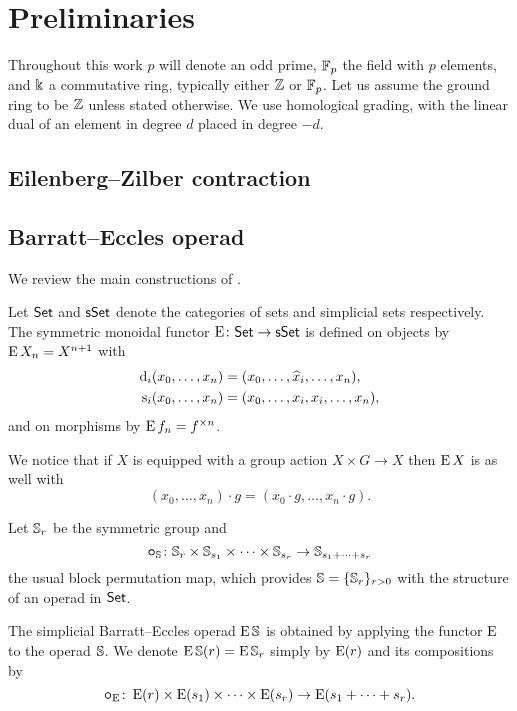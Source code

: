 
\section{Preliminaries}

Throughout this work $p$ will denote an odd prime, ${\mathbb{F}_p}$ the field with $p$ elements, and $\Bbbk$ a commutative ring, typically either $\mathbb{Z}$ or ${\mathbb{F}_p}$.
Let us assume the ground ring to be $\mathbb{Z}$ unless stated otherwise.
We use homological grading, with the linear dual of an element in degree $d$ placed in degree $-d$.

\subsection{Eilenberg--Zilber contraction}

\TBW

\subsection{Barratt--Eccles operad}

We review the main constructions of \cite{berger2004combinatorial}.

\sssec

Let $\mathsf{Set}$ and $\mathsf{sSet}$ denote the categories of sets and simplicial sets respectively.
The symmetric monoidal functor $\operatorname{E} \colon \mathsf{Set} \to \mathsf{sSet}$ is defined on objects by $\operatorname{E} X_n = X^{n+1}$ with
\[
\begin{split}
	\operatorname{d}_i(x_0,\dots,x_n) &= (x_0,\dots,\widehat{x}_i,\dots,x_n), \\
	\operatorname{s}_i(x_0,\dots,x_n) &= (x_0, \dots, x_i, x_i, \dots, x_n),
\end{split}
\]
and on morphisms by $\operatorname{E} f_n = f^{\times n}$.

We notice that if $X$ is equipped with a group action $X \times G \to X$ then $\operatorname{E} X$ is as well with
\[
(x_0,\dots,x_n) \cdot g = (x_0 \cdot g, \dots, x_n \cdot g).
\]

\sssec

Let $\mathbb{S}_r$ be the symmetric group and
\[
\bm{\circ}_{\mathbb{S}} \colon \mathbb{S}_r \times \mathbb{S}_{s_1} \times \cdots \times \mathbb{S}_{s_r} \to \mathbb{S}_{s_1+\dots+s_r}
\]
the usual block permutation map, which provides $\mathbb{S} = \{\mathbb{S}_r\}_{r>0}$ with the structure of an operad in $\mathsf{Set}$.

\sssec

The simplicial Barratt--Eccles operad $\operatorname{E}\mathbb{S}$ is obtained by applying the functor $\operatorname{E}$ to the operad $\mathbb{S}$.
We denote $\operatorname{E}\mathbb{S}(r) = \operatorname{E}\mathbb{S}_r$ simply by $\operatorname{E}(r)$ and its compositions by
\[
\bm{\circ}_{\operatorname{E}} \colon \operatorname{E}(r) \times \operatorname{E}(s_1) \times\dots\times \operatorname{E}(s_r) \to \operatorname{E}(s_1+\dots+s_r).
\]

